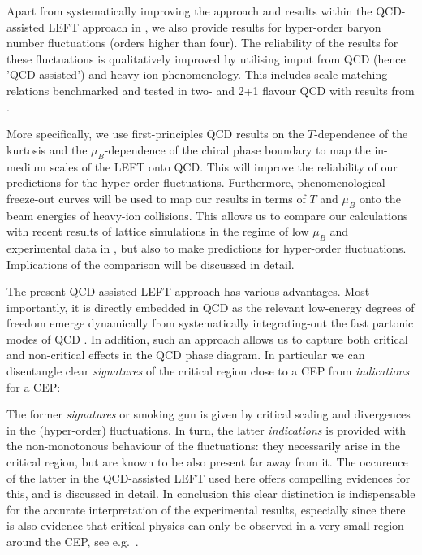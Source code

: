 \documentclass[%
reprint,
superscriptaddress,
showpacs,preprintnumbers,
amsmath,amssymb,
aps,
prd,
]{revtex4-1}
\begin{document}
	Apart from systematically improving the approach and results within the QCD-assisted LEFT approach in  \cite{Fu:2015naa,Fu:2015amv,Fu:2016tey}, we also provide results for  hyper-order baryon number fluctuations (orders higher than four). The reliability of the results for these fluctuations is qualitatively improved by utilising imput from QCD (hence  'QCD-assisted') and heavy-ion phenomenology. This includes scale-matching relations benchmarked and tested in two- and 2+1 flavour QCD with results from \cite{Fu:2019hdw} . 
	
	
	More specifically, we use first-principles QCD results on the $T$-dependence of the kurtosis and the $\mu_B$-dependence of the chiral phase boundary to map the in-medium scales of the LEFT onto QCD. This will improve the reliability of our predictions for the hyper-order fluctuations. Furthermore, phenomenological freeze-out curves will be used to map our results in terms of $T$ and $\mu_B$ onto the beam energies of heavy-ion collisions.
	This allows us to compare our calculations with recent results of lattice simulations in the regime of low $\mu_B$ and experimental data in \cite{Adam:2020unf,Nonaka:2020crv,Pandav:2020uzx}, but also to make predictions for hyper-order fluctuations. Implications of the comparison will be discussed in detail.
	
	The present QCD-assisted LEFT approach has various advantages. Most importantly, it is directly embedded in QCD as the relevant low-energy degrees of freedom emerge dynamically from systematically integrating-out the fast partonic modes of QCD \cite{Mitter:2014wpa, Braun:2014ata, Rennecke:2015eba, Cyrol:2017ewj, Fu:2019hdw}. In addition, such an approach allows us to capture both critical and non-critical effects in the QCD phase diagram. In particular we can disentangle clear \textit{signatures} of the critical region close to a CEP from \textit{indications} for a CEP: 
	
	The former \textit{signatures} or smoking gun is given by critical scaling and divergences in the (hyper-order) fluctuations. In turn, the latter \textit{indications} is provided with the non-monotonous behaviour of the fluctuations: they necessarily arise in the critical region, but are known to be also present far away from it. The occurence of the latter in the QCD-assisted LEFT used here offers compelling evidences for this, and is discussed in detail. In conclusion this clear distinction is indispensable for the accurate interpretation of the experimental results, especially since there is also evidence that critical physics can only be observed in a very small region around the CEP, see e.g.\ \cite{Schaefer:2006ds}. 
	
\end{document}
